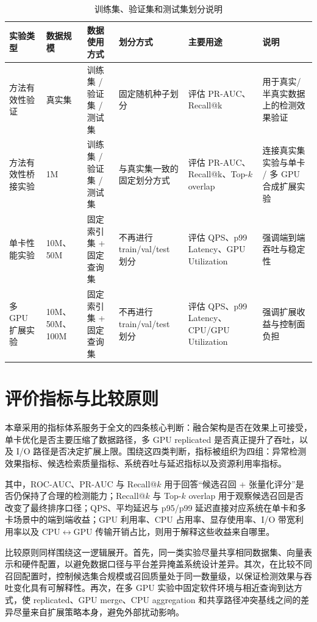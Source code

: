 \begin{table}[htbp]
  \caption{训练集、验证集和测试集划分说明}
  \label{tab:data-split}
  \centering
  \small
  \renewcommand{\arraystretch}{1.15}
  \begin{adjustbox}{max width=\linewidth}
  \begin{tabular}{P{2.3cm}P{2.2cm}P{3.3cm}P{2.9cm}P{3.4cm}P{2.6cm}}
    \toprule
    实验类型 & 数据规模 & 数据使用方式 & 划分方式 & 主要用途 & 说明 \\
    \midrule
    方法有效性验证 & 真实集 & 训练集 / 验证集 / 测试集 & 固定随机种子划分 & 评估 PR-AUC、Recall@k & 用于真实/半真实数据上的检测效果验证 \\
    方法有效性桥接实验 & 1M & 训练集 / 验证集 / 测试集 & 与真实集一致的固定划分方式 & 评估 PR-AUC、Recall@k、Top-$k$ overlap & 连接真实集实验与单卡 / 多 GPU 合成扩展实验 \\
    单卡性能实验 & 10M、50M & 固定索引集 + 固定查询集 & 不再进行 train/val/test 划分 & 评估 QPS、p99 Latency、GPU Utilization & 强调端到端吞吐与稳定性 \\
    多 GPU 扩展实验 & 10M、50M、100M & 固定索引集 + 固定查询集 & 不再进行 train/val/test 划分 & 评估 QPS、p99 Latency、CPU/GPU Utilization & 强调扩展收益与控制面负担 \\
    \bottomrule
  \end{tabular}
  \end{adjustbox}
\end{table}


\section{评价指标与比较原则}

本章采用的指标体系服务于全文的四条核心判断：融合架构是否在效果上可接受，单卡优化是否主要压缩了数据路径，多 GPU replicated 是否真正提升了吞吐，以及 I/O 路径是否决定扩展上限。围绕这四类判断，指标被组织为四组：异常检测效果指标、候选检索质量指标、系统吞吐与延迟指标以及资源利用率指标。

其中，ROC-AUC、PR-AUC 与 Recall@$k$ 用于回答“候选召回 + 张量化评分”是否仍保持了合理的检测能力；Recall@$k$ 与 Top-$k$ overlap 用于观察候选召回是否改变了最终排序口径；QPS、平均延迟与 p95/p99 延迟直接对应系统在单卡和多卡场景中的端到端收益；GPU 利用率、CPU 占用率、显存使用率、I/O 带宽利用率以及 CPU$\leftrightarrow$GPU 传输开销占比，则用于解释这些收益来自哪里。

比较原则同样围绕这一逻辑展开。首先，同一类实验尽量共享相同数据集、向量表示和硬件配置，以避免数据口径与平台差异掩盖系统设计差异。其次，在比较不同召回配置时，控制候选集合规模或召回质量处于同一数量级，以保证检测效果与吞吐变化具有可解释性。再次，在多 GPU 实验中固定软件环境与相近查询到达方式，使 replicated、GPU merge、CPU aggregation 和共享路径冲突基线之间的差异尽量来自扩展策略本身，避免外部扰动影响。


